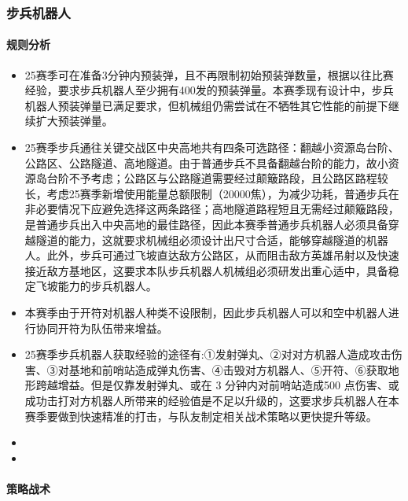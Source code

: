 \subsubsection{步兵机器人}

    \paragraph{规则分析}


        \begin{itemize}
            \item 25赛季可在准备3分钟内预装弹，且不再限制初始预装弹数量，根据以往比赛经验，要求步兵机器人至少拥有400发的预装弹量。本赛季现有设计中，步兵机器人预装弹量已满足要求，但机械组仍需尝试在不牺牲其它性能的前提下继续扩大预装弹量。
            \item 25赛季步兵通往关键交战区中央高地共有四条可选路径：翻越小资源岛台阶、公路区、公路隧道、高地隧道。由于普通步兵不具备翻越台阶的能力，故小资源岛台阶不予考虑；公路区与公路隧道需要经过颠簸路段，且公路区路程较长，考虑25赛季新增使用能量总额限制（20000焦），为减少功耗，普通步兵在非必要情况下应避免选择这两条路径；高地隧道路程短且无需经过颠簸路段，是普通步兵出入中央高地的最佳路径，因此本赛季普通步兵机器人必须具备穿越隧道的能力，这就要求机械组必须设计出尺寸合适，能够穿越隧道的机器人。此外，步兵可通过飞坡直达敌方公路区，从而阻击敌方英雄吊射以及快速接近敌方基地区，这要求本队步兵机器人机械组必须研发出重心适中，具备稳定飞坡能力的步兵机器人。
            \item 本赛季由于开符对机器人种类不设限制，因此步兵机器人可以和空中机器人进行协同开符为队伍带来增益。
            \item 25赛季步兵机器人获取经验的途径有:①发射弹丸、②对对方机器人造成攻击伤害、③对基地和前哨站造成弹丸伤害、④击毁对方机器人、⑤开符、⑥获取地形跨越增益。但是仅靠发射弹丸、或在 3 分钟内对前哨站造成500 点伤害、或成功击打对方机器人所带来的经验值是不足以升级的，这要求步兵机器人在本赛季要做到快速精准的打击，与队友制定相关战术策略以更快提升等级。
            \item 
            \item 
            
        \end{itemize}
    
    \paragraph{策略战术}

